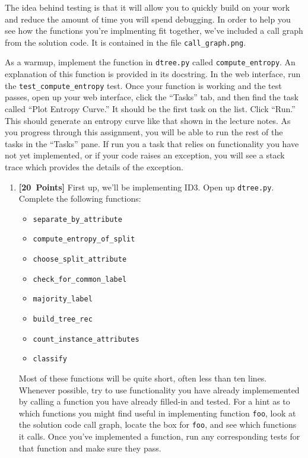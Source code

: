 \documentclass{article}
\newcommand{\points}[1]{\mbox{\textbf{[#1 Points]}}}
\begin{document}
\begin{enumerate}
The idea behind testing is that it will allow you to quickly build on
your work and reduce the amount of time you will spend debugging. In
order to help you see how the functions you're implmenting fit
together, we've included a call graph from the solution code. It is
contained in the file \verb=call_graph.png=.

As a warmup, implement the function in \verb=dtree.py= called
\verb=compute_entropy=. An explanation of this function is provided in
its docstring. In the web interface, run the
\verb=test_compute_entropy= test. Once your function is working and
the test passes, open up your web interface,
click the ``Tasks'' tab, and then find the task called ``Plot Entropy
Curve.'' It should be the first task on the list. Click ``Run.'' This
should generate an entropy curve like that shown in the lecture
notes. As you progress through this assignment, you will be able to
run the rest of the tasks in the ``Tasks'' pane. If run you a task that
relies on functionality you have not yet implemented, or if your code
raises an exception, you will see a stack trace which provides the
details of the exception.

\begin{enumerate}
\item \points{20} First up, we'll be implementing ID3. Open up
  \verb#dtree.py#. Complete the following functions:
  \begin{itemize}
    \item \verb=separate_by_attribute=
    \item \verb=compute_entropy_of_split=
    \item \verb=choose_split_attribute=
    \item \verb=check_for_common_label=
    \item \verb=majority_label=
    \item \verb=build_tree_rec=
    \item \verb=count_instance_attributes=
    \item \verb=classify=
  \end{itemize}
Most of these functions will be quite short, often less than ten
lines. Whenever possible, try to use functionality you have already
implememented by calling a function you have already filled-in and
tested. For a hint as to which functions you might find useful in
implementing function \verb=foo=, look at the solution code call
graph, locate the box for \verb=foo=, and see which functions it
calls. Once you've implemented a function, run any corresponding tests
for that function and make sure they pass.\\


\end{enumerate}
\end{enumerate}
\end{document}
